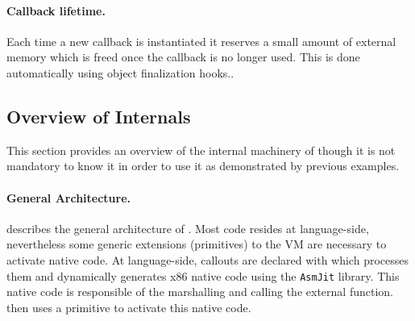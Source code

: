 



\paragraph{Callback lifetime.}
Each time a new callback is instantiated it reserves a small amount of external memory which is freed once the callback is no longer used.
This is done automatically using object finalization hooks..


\subsection{Overview of \NBFFI Internals}

This section provides an overview of the internal machinery of \NBFFI though it is not mandatory to know it in order to use it as demonstrated by previous examples.

\paragraph{General Architecture.}
 describes the general architecture of \NB.
Most code resides at language-side, nevertheless some generic extensions (primitives) to the VM are necessary to activate native code.
At language-side, callouts are declared with \NBFFI which processes them and dynamically generates x86 native code using the \texttt{AsmJit} library.
This native code is responsible of the marshalling and calling the external function.
\NB then uses a primitive to activate this native code.

